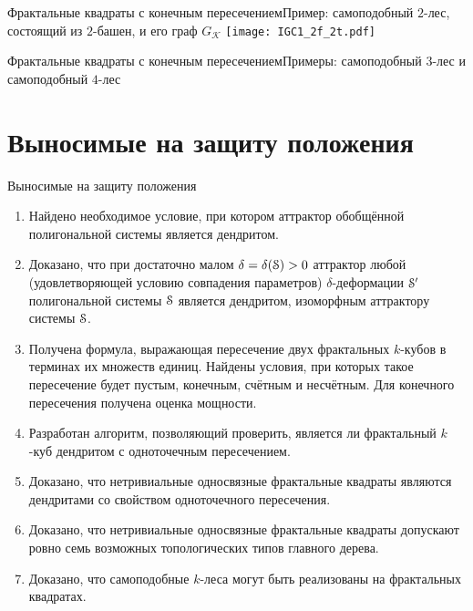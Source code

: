 \documentclass[aspectratio=1610, 10pt, notheorems]{beamer}
\begin{document}
\begin{frame}{Фрактальные квадраты с конечным пересечением}{Пример: самоподобный $2$-лес, состоящий из $2$-башен, и его граф $G_{\mathcal{K}}$}
\hfill
\texttt{[image: IGC1\_2f\_2t.pdf]}
\end{frame}


\begin{frame}{Фрактальные квадраты с конечным пересечением}{Примеры: самоподобный $3$-лес и самоподобный $4$-лес}
\hfill
{}
\end{frame}


\section{Выносимые на защиту положения} 

\begin{frame}{Выносимые на защиту положения}

{\footnotesize
\begin{enumerate}
\item Найдено необходимое условие, при котором аттрактор обобщённой полигональной системы является дендритом.
\item Доказано, что при достаточно малом $\delta=\delta({\EuScript S})>0$ аттрактор любой (удовлетворяющей условию совпадения параметров) $\delta$-деформации ${\EuScript S}'$ полигональной системы ${\EuScript S}$ является дендритом, изоморфным аттрактору системы ${\EuScript S}$.
\item Получена формула, выражающая пересечение двух фрактальных $k$-кубов в терминах их множеств единиц.
Найдены условия, при которых такое пересечение будет пустым, конечным, счётным и несчётным.
Для конечного пересечения получена оценка мощности.
\item Разработан алгоритм, позволяющий проверить, является ли фрактальный $k$-куб дендритом с одноточечным пересечением.
\item Доказано, что нетривиальные односвязные фрактальные квадраты являются дендритами со свойством одноточечного пересечения.
\item Доказано, что нетривиальные односвязные фрактальные квадраты допускают ровно семь возможных топологических типов главного дерева.
\item Доказано, что самоподобные $k$-леса могут быть реализованы на фрактальных квадратах.
\end{enumerate}}

\end{frame}
\end{document}
